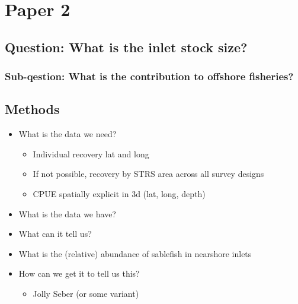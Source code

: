 \documentclass[12pt]{article}
\begin{document}
\section*{Paper 2}

\subsection*{Question: What is the inlet stock size?}
\subsubsection*{Sub-qestion: What is the contribution to offshore fisheries?}

\subsection*{Methods}
\begin{itemize}
  \item What is the data we need?
    \begin{itemize}
      \item Individual recovery lat and long
      \item If not possible, recovery by STRS area across all survey designs
      \item CPUE spatially explicit in 3d (lat, long, depth)
    \end{itemize}
  \item What is the data we have?
  \item What can it tell us?
    \item What is the (relative) abundance of sablefish in nearshore inlets
  \item How can we get it to tell us this?
    \begin{itemize}
      \item Jolly Seber (or some variant)
    \end{itemize}
\end{itemize}
\end{document}
